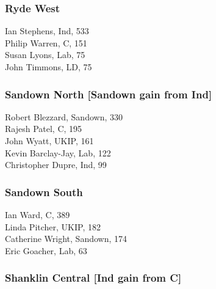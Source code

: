 \documentclass[a4paper,openany,10pt]{book}
\begin{document}
\subsubsection*{Ryde West}



Ian Stephens, Ind, 533\\
Philip Warren, C, 151\\
Susan Lyons, Lab, 75\\
John Timmons, LD, 75\\


\subsubsection*{Sandown North \hspace*{\fill}\nolinebreak[1]%
\enspace\hspace*{\fill}
[Sandown gain from Ind]}



Robert Blezzard, Sandown, 330\\
Rajesh Patel, C, 195\\
John Wyatt, UKIP, 161\\
Kevin Barclay-Jay, Lab, 122\\
Christopher Dupre, Ind, 99\\


\subsubsection*{Sandown South}



Ian Ward, C, 389\\
Linda Pitcher, UKIP, 182\\
Catherine Wright, Sandown, 174\\
Eric Goacher, Lab, 63\\


\subsubsection*{Shanklin Central \hspace*{\fill}\nolinebreak[1]%
\enspace\hspace*{\fill}
[Ind gain from C]}
\end{document}
